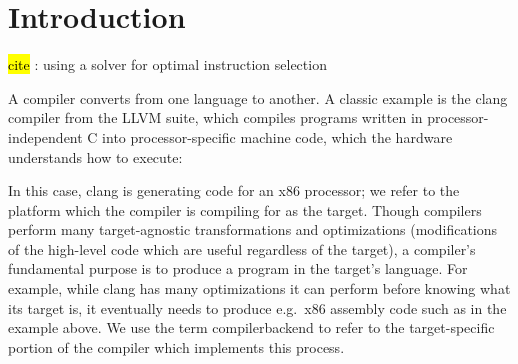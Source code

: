 \chapter{Introduction}

\hl{cite} \cite{ebner2008generalized}: using a solver for optimal instruction selection

A \gls{compiler}
  converts from one language
  to another.
A classic example
  is the clang compiler
  from the LLVM suite,
  which
  compiles programs written in 
  processor-independent C
  into processor-specific
  machine code,
  which the hardware understands how
  to execute:
\begin{figure}[!h]
\centering
{}
\end{figure}

\noindent
In this case,
  clang is generating code 
  for an x86 processor;
  we refer to 
  the platform
  which the compiler is compiling for
  as the \gls{target}.
Though compilers perform many target-agnostic
  transformations and optimizations
  (modifications of the high-level code
    which are useful regardless of the target),
  a compiler's fundamental purpose
  is to produce a program
  in the target's language.
For example,
  while clang has many optimizations
  it can perform
  before knowing what its target is,
  it eventually needs to produce e.g.~x86
  assembly code
  such as in the example above.
We use the term
  \gls{compilerbackend}
  to refer to the target-specific portion
  of the compiler
  which implements this process.

